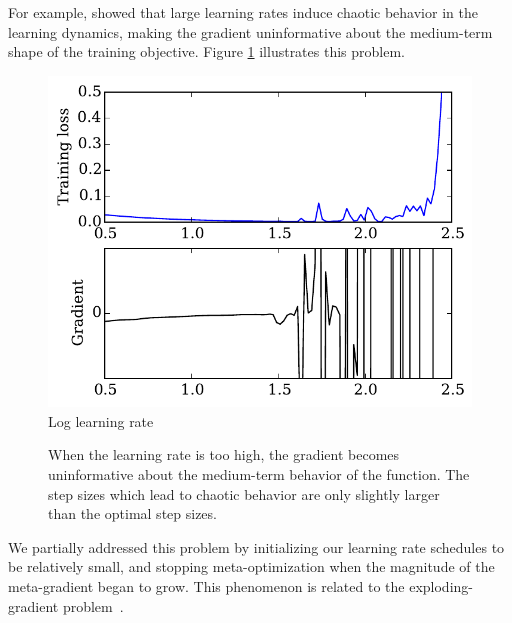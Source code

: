 \documentclass{article}
\begin{document}

For example, \citet*[Chapter 4]{pearlmutter1996investigation} showed that 
large learning rates induce chaotic behavior in the learning dynamics,
making the gradient uninformative about the medium-term shape of the training objective.
Figure \ref{fig:chaos} illustrates this problem.

\begin{figure}[h!]
\vskip 0.2in
\begin{center}
\includegraphics[width=\columnwidth]{../experiments/Jan_14_learning_rate_wiggliness/2/chaos.pdf}
\vskip -0.1in
Log learning rate
\caption{When the learning rate is too high, the gradient becomes uninformative about the medium-term behavior of the function.
The step sizes which lead to chaotic behavior are only slightly larger than the optimal step sizes.}
\label{fig:chaos}
\end{center}
\vskip -0.2in
\end{figure} 

We partially addressed this problem by initializing our learning rate schedules to be relatively small, and stopping meta-optimization when the magnitude of the meta-gradient began to grow.
This phenomenon is related to the exploding-gradient problem~\cite{pascanu2012understanding}.
\end{document}
